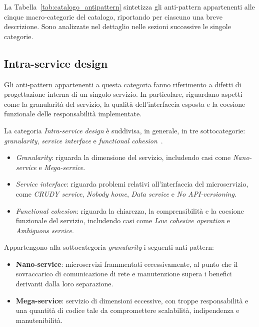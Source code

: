 La Tabella~\ref{tab:catalogo_antipattern} sintetizza gli anti-pattern appartenenti alle cinque macro-categorie del catalogo, riportando per ciascuno una breve descrizione.
Sono analizzate nel dettaglio nelle sezioni successive le singole categorie.


\subsection{Intra-service design}

Gli anti-pattern appartenenti a questa categoria fanno riferimento a difetti di progettazione interna di un singolo servizio. In particolare, riguardano aspetti come la granularità del servizio, la qualità dell’interfaccia esposta e la coesione funzionale delle responsabilità implementate.

La categoria \textit{Intra-service design} è suddivisa, in generale, in tre sottocategorie: \textit{granularity}, \textit{service interface} e \textit{functional cohesion}~\cite{CernyCatalogo}.

\begin{itemize}
    \item \textit{Granularity}: riguarda la dimensione del servizio, includendo casi come \textit{Nano-service} e \textit{Mega-service}.
    \item \textit{Service interface}: riguarda problemi relativi all’interfaccia del microservizio, come \textit{CRUDY service}, \textit{Nobody home}, \textit{Data service} e \textit{No API-versioning}.
    \item \textit{Functional cohesion}: riguarda la chiarezza, la comprensibilità e la coesione funzionale del servizio, includendo casi come \textit{Low cohesive operation} e \textit{Ambiguous service}.
\end{itemize}

Appartengono alla sottocategoria \textit{granularity} i seguenti anti-pattern:
\begin{itemize}
    \item \textbf{Nano-service}: microservizi frammentati eccessivamente, al punto che il sovraccarico di comunicazione di rete e manutenzione supera i benefici derivanti dalla loro separazione.
    \item \textbf{Mega-service}: servizio di dimensioni eccessive, con troppe responsabilità e una quantità di codice tale da compromettere scalabilità, indipendenza e manutenibilità.
\end{itemize}

